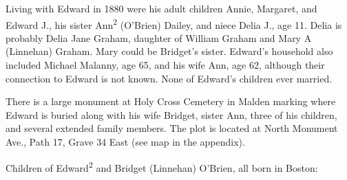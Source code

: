 Living with Edward in 1880 were his adult children Annie, Margaret, and Edward J., his sister Ann\textsuperscript{2} (O'Brien) Dailey, and niece Delia J., age 11.\cite{Census1880Edward} Delia is probably Delia Jane Graham, daughter of William Graham and Mary A (Linnehan) Graham.\cite{DeliaGrahamBirth,MaryGrahamDeath} Mary could be Bridget's sister. Edward's household also included Michael Malanny, age 65, and his wife Ann, age 62, although their connection to Edward is not known.\cite{Census1880Edward} None of Edward's children ever married. 

There is a large monument at Holy Cross Cemetery in Malden marking where Edward is buried along with his wife Bridget, sister Ann, three of his children, and several extended family members. The plot is located at North Monument Ave., Path 17, Grave 34 East (see map in the appendix).\cite{Edward2OBrienGrave,CarolGordon}

\begin{KidsIntro}
	Children of Edward\textsuperscript{2} and Bridget (Linnehan) O'Brien, all born in Boston:
\end{KidsIntro}

